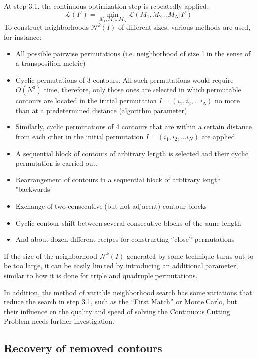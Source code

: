 \documentclass[]{llncs}
\begin{document}
At step 3.1,
the continuous optimization step is repeatedly applied:
$$
\mathcal L (I') = \min_{M_1, M_2 \dots M_N}
  \mathcal L (M_1, M_2 \dots M_N | I')
$$
To construct neighborhoods
$\mathcal N^k(I)$
of different sizes, various methods are used,
for instance:

\begin{itemize}
  \item All possible pairwise permutations
  (i.e. neighborhood of size 1 in the sense of a transposition metric)
  \item
  Cyclic permutations of 3 contours.
  All such permutations would require
  $O (N ^ 3)$ time,
  therefore, only those ones are selected
  in which permutable contours are located
  in the initial permutation
  $I = (i_1, i_2, ... i_N)$
  no more than at a predetermined distance
  (algorithm parameter).
  \item
  Similarly,
  cyclic permutations of 4 contours
  that are within a certain distance from each other
  in the initial permutation
  $I = (i_1, i_2, ... i_N)$
  are applied.
  \item
  A sequential block of contours
  of arbitrary length is selected
  and their cyclic permutation is carried out.
  \item
  Rearrangement of contours in a sequential block
  of arbitrary length "backwards"
  \item
  Exchange of two consecutive
  (but not adjacent)
  contour blocks
  \item
  Cyclic contour shift between
  several consecutive blocks of the same length
  \item
  And about dozen different recipes for constructing ``close'' permutations
\end{itemize}

If the size of the neighborhood
$\mathcal N^k(I)$
generated by some technique
turns out to be too large,
it can be easily limited by
introducing an additional parameter,
similar to how it is done for
triple and quadruple permutations.

In addition,
the method of variable neighborhood search
has some variations that reduce
the search in step 3.1,
such as the ``First Match''
or Monte Carlo,
but their influence on the quality and speed of
solving the Continuous Cutting Problem
needs further investigation.

\subsection{Recovery of removed contours}
\end{document}
